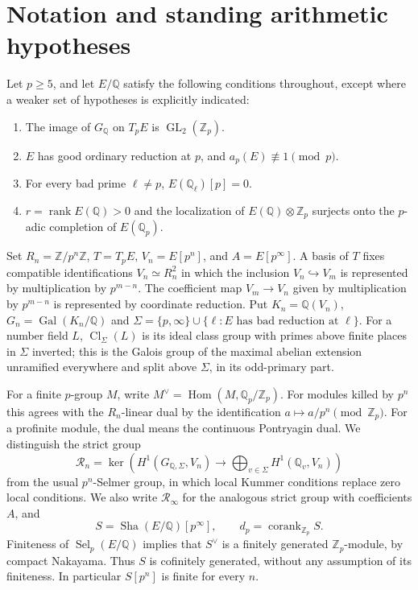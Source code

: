 \documentclass[11pt,a4paper]{article}
\theoremstyle{definition}\newtheorem{definition}[theorem]{Definition}
\theoremstyle{remark}\newtheorem{remark}[theorem]{Remark}
\newcommand{\Sha}{\operatorname{\mathrm{Sha}}}\newcommand{\ZZ}{\mathbb Z}\newcommand{\QQ}{\mathbb Q}\newcommand{\FF}{\mathbb F}\newcommand{\Gal}{\operatorname{Gal}}\newcommand{\Hom}{\operatorname{Hom}}\newcommand{\End}{\operatorname{End}}\newcommand{\Cl}{\operatorname{Cl}}\newcommand{\Sel}{\operatorname{Sel}}\newcommand{\rk}{\operatorname{rank}}\newcommand{\corank}{\operatorname{corank}}\newcommand{\ord}{\operatorname{ord}}\newcommand{\im}{\operatorname{im}}\newcommand{\length}{\operatorname{length}}\newcommand{\GL}{\operatorname{GL}}\newcommand{\NS}{\operatorname{NS}}\newcommand{\Br}{\operatorname{Br}}\newcommand{\Pic}{\operatorname{Pic}}\newcommand{\Sym}{\operatorname{Sym}}\newcommand{\R}{\mathcal R}\newcommand{\A}{\mathcal A}\newcommand{\D}{\mathcal D}\newcommand{\W}{\mathscr W}\newcommand{\Y}{\mathscr Y}\newcommand{\I}{\mathfrak I}
\numberwithin{equation}{section}
\begin{document}
\section{Notation and standing arithmetic hypotheses}
Let $p\ge5$, and let $E/\QQ$ satisfy the following conditions throughout, except where a weaker set of hypotheses is explicitly indicated:
\begin{enumerate}
\item[(H1)] The image of $G_{\QQ}$ on $T_pE$ is $\GL_2(\ZZ_p)$.
\item[(H2)] $E$ has good ordinary reduction at $p$, and $a_p(E)\not\equiv1\pmod p$.
\item[(H3)] For every bad prime $\ell\ne p$, $E(\QQ_\ell)[p]=0$.
\item[(H4)] $r=\rk E(\QQ)>0$ and the localization of $E(\QQ)\otimes\ZZ_p$ surjects onto the $p$-adic completion of $E(\QQ_p)$.
\end{enumerate}
Set $R_n=\ZZ/p^n\ZZ$, $T=T_pE$, $V_n=E[p^n]$, and $A=E[p^\infty]$. A basis of $T$ fixes compatible identifications $V_n\simeq R_n^2$ in which the inclusion $V_n\hookrightarrow V_m$ is represented by multiplication by $p^{m-n}$. The coefficient map $V_m\to V_n$ given by multiplication by $p^{m-n}$ is represented by coordinate reduction. Put $K_n=\QQ(V_n)$, $G_n=\Gal(K_n/\QQ)$ and $\Sigma=\{p,\infty\}\cup\{\ell:E\text{ has bad reduction at }\ell\}$. For a number field $L$, $\Cl_\Sigma(L)$ is its ideal class group with primes above finite places in $\Sigma$ inverted; this is the Galois group of the maximal abelian extension unramified everywhere and split above $\Sigma$, in its odd-primary part.

For a finite $p$-group $M$, write $M^\vee=\Hom(M,\QQ_p/\ZZ_p)$. For modules killed by $p^n$ this agrees with the $R_n$-linear dual by the identification $a\mapsto a/p^n\pmod{\ZZ_p}$. For a profinite module, the dual means the continuous Pontryagin dual. We distinguish the strict group
\begin{equation}\label{eq:strictdef}
\R_n=\ker\left(H^1(G_{\QQ,\Sigma},V_n)\longrightarrow
\bigoplus_{v\in\Sigma}H^1(\QQ_v,V_n)\right)
\end{equation}
from the usual $p^n$-Selmer group, in which local Kummer conditions replace zero local conditions. We also write $\R_\infty$ for the analogous strict group with coefficients $A$, and
\[
S=\Sha(E/\QQ)[p^\infty],\qquad d_p=\corank_{\ZZ_p} S.
\]
Finiteness of $\Sel_p(E/\QQ)$ implies that $S^\vee$ is a finitely generated $\ZZ_p$-module, by compact Nakayama. Thus $S$ is cofinitely generated, without any assumption of its finiteness. In particular $S[p^n]$ is finite for every $n$.
\end{document}

